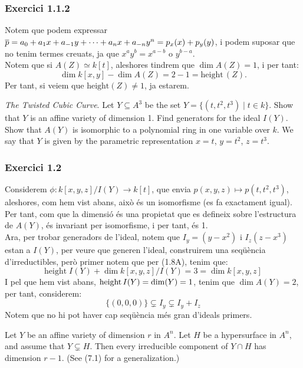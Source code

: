 \documentclass[11pt, a4paper]{article}
\begin{document}
\subsubsection{Exercici 1.1.2}
Notem que podem expressar $\overline p=a_0 +a_1x+a_{-1}y+\dots +a_n x+a_{-n}y^n=p_x(x)+p_y(y)$, i podem suposar que no tenim termes creuats, ja que $x^ay^b=x^{a-b}$ o $y^{b-a}$.\\[2mm]
Notem que si $A(Z)\simeq k[t]$, aleshores tindrem que $\dim A(Z)=1$, i per tant: 
\[
\dim k[x,y]-\dim A(Z)=2-1=\mathrm{height}\,(Z).
\] 
Per tant, si veiem que $\mathrm{height} (Z)\neq 1$, ja estarem.\\
\newpage
\begin{tcolorbox}[title=\subsection{Exercici 1.2}]
    \textit{The Twisted Cubic Curve}. Let $Y \subseteq A^3$ be the set $Y = \{ (t,t^2 ,t^3) \mid t \in k\}$. Show that $Y$ is an affine variety of dimension 1. Find generators for the ideal $I(Y)$. Show that $A(Y)$ is isomorphic to a polynomial ring in one variable over $k$. We say that $Y$ is given by the parametric representation $x = t$, $y = t^2$, $z = t^3$.
\end{tcolorbox}
\subsubsection{Exercici 1.2}
Considerem $\phi:k[x,y,z]/I(Y)\to k[t]$, que envia $p(x,y,z)\mapsto p(t,t^2,t^3)$, aleshores, com hem vist abans, això és un isomorfisme (es fa exactament igual). Per tant, com que la dimensió és una propietat que es defineix sobre l'estructura de $A(Y)$, és invariant per isomorfisme, i per tant, és 1.\\[3mm]
\[\]
Ara, per trobar generadors de l'ideal, notem que $I_y=(y-x^2)$ i $I_z(z-x^3)$ estan a $I(Y)$, per veure que generen l'ideal, construirem una seqüència d'irreductibles, però primer notem que per (1.8A), tenim que:
\[
    \mathrm{height}\; I(Y) + \dim k[x,y,z]/I(Y) =3=\dim k[x,y,z]
\]
I pel que hem vist abans, $\operatorname*{height} I(Y)=\dim (Y)=1$, tenim que $\dim A(Y)=2$, per tant, considerem:
\[
    \{(0,0,0)\}\subsetneq I_y \subsetneq I_y+I_z
\]
Notem que no hi pot haver cap seqüència més gran d'ideals primers.
\newpage
\begin{tcolorbox}[title=\subsection{Exercici 1.8}]
Let $Y$ be an affine variety of dimension $r$ in $A^n$. Let $H$ be a hypersurface in $A^n$, and assume that $Y \subsetneq H$. Then every irreducible component of $Y \cap H$ has dimension $r - 1$. (See (7.1) for a generalization.)
\end{tcolorbox}
\end{document}
